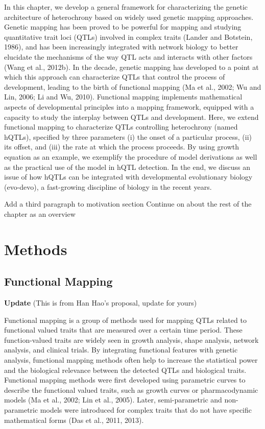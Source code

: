 \documentclass[]{book}
\theoremstyle{definition}
\theoremstyle{definition}
\theoremstyle{remark}
\begin{document}
In this chapter, we develop a general framework for characterizing the
genetic architecture of heterochrony based on widely used genetic
mapping approaches. Genetic mapping has been proved to be powerful for
mapping and studying quantitative trait loci (QTLs) involved in complex
traits (Lander and Botstein, 1986), and has been increasingly integrated
with network biology to better elucidate the mechanisms of the way QTL
acts and interacts with other factors (Wang et al., 2012b). In the
decade, genetic mapping has developed to a point at which this approach
can characterize QTLs that control the process of development, leading
to the birth of functional mapping (Ma et al., 2002; Wu and Lin, 2006;
Li and Wu, 2010). Functional mapping implements mathematical aspects of
developmental principles into a mapping framework, equipped with a
capacity to study the interplay between QTLs and development. Here, we
extend functional mapping to characterize QTLs controlling heterochrony
(named hQTLs), specified by three parameters (i) the onset of a
particular process, (ii) its offset, and (iii) the rate at which the
process proceeds. By using growth equation as an example, we exemplify
the procedure of model derivations as well as the practical use of the
model in hQTL detection. In the end, we discuss an issue of how hQTLs
can be integrated with developmental evolutionary biology (evo-devo), a
fast-growing discipline of biology in the recent years.

Add a third paragraph to motivation section Continue on about the rest
of the chapter as an overview

\section{Methods}\label{methods-2}

\subsection{Functional Mapping}\label{functional-mapping}

\textbf{Update} (This is from Han Hao's proposal, update for yours)

Functional mapping is a group of methods used for mapping QTLs related
to functional valued traits that are measured over a certain time
period. These function-valued traits are widely seen in growth analysis,
shape analysis, network analysis, and clinical trials. By integrating
functional features with genetic analysis, functional mapping methods
often help to increase the statistical power and the biological
relevance between the detected QTLs and biological traits. Functional
mapping methods were first developed using parametric curves to describe
the functional valued traits, such as growth curves or pharmacodynamic
models (Ma et al., 2002; Lin et al., 2005). Later, semi-parametric and
non-parametric models were introduced for complex traits that do not
have specific mathematical forms (Das et al., 2011, 2013).
\end{document}
